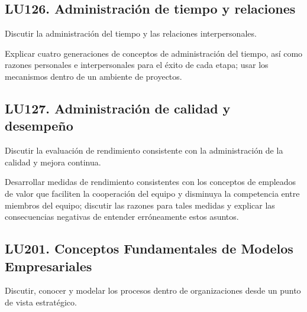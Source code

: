 \subsection{LU126. Administración de tiempo y relaciones}\label{sec:BOK-LU126}\label{sec:LU126}
\begin{LearningUnit}
\begin{LUGoal}
\item Discutir la administración del tiempo y las relaciones interpersonales.
\end{LUGoal}

\begin{LUObjective}
\item Explicar cuatro generaciones de conceptos de administración del tiempo, así como razones personales e interpersonales para el éxito de cada etapa; usar los mecanismos dentro de un ambiente de proyectos.
\end{LUObjective}
\end{LearningUnit}

\subsection{LU127. Administración de calidad y desempeño}\label{sec:BOK-LU127}\label{sec:LU127}
\begin{LearningUnit}
\begin{LUGoal}
\item Discutir la evaluación de rendimiento consistente con la administración de la calidad y mejora continua.
\end{LUGoal}

\begin{LUObjective}
\item Desarrollar medidas de rendimiento consistentes con los conceptos de empleados de valor que faciliten la cooperación del equipo y disminuya la competencia entre miembros del equipo; discutir las razones para tales medidas y explicar las consecuencias negativas de entender erróneamente estos asuntos.
\end{LUObjective}
\end{LearningUnit}

\subsection{LU201. Conceptos Fundamentales de Modelos Empresariales}\label{sec:BOK-LU201}\label{sec:LU201}
\begin{LearningUnit}
\begin{LUGoal}
\item Discutir, conocer y modelar los procesos dentro de organizaciones desde un punto de vista estratégico.
\end{LUGoal}

\end{LearningUnit}

